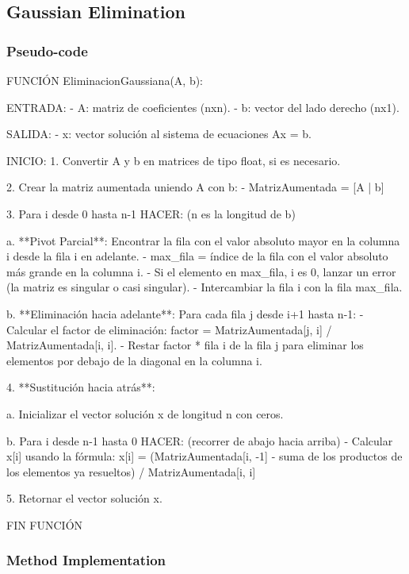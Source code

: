 \documentclass{article}
\begin{document}
    \subsection{Gaussian Elimination}
        \subsubsection{Pseudo-code}
        FUNCIÓN EliminacionGaussiana(A, b):

    ENTRADA:
    - A: matriz de coeficientes (nxn).
    - b: vector del lado derecho (nx1).

    SALIDA:
    - x: vector solución al sistema de ecuaciones Ax = b.

    INICIO:
    1. Convertir A y b en matrices de tipo float, si es necesario.

    2. Crear la matriz aumentada uniendo A con b:
       - MatrizAumentada = [A | b]

    3. Para i desde 0 hasta n-1 HACER:  (n es la longitud de b)

        a. **Pivot Parcial**: Encontrar la fila con el valor absoluto mayor en la columna i desde la fila i en adelante.
           - max_fila = índice de la fila con el valor absoluto más grande en la columna i.
           - Si el elemento en max_fila, i es 0, lanzar un error (la matriz es singular o casi singular).
           - Intercambiar la fila i con la fila max_fila.

        b. **Eliminación hacia adelante**: Para cada fila j desde i+1 hasta n-1:
            - Calcular el factor de eliminación: factor = MatrizAumentada[j, i] / MatrizAumentada[i, i].
            - Restar factor * fila i de la fila j para eliminar los elementos por debajo de la diagonal en la columna i.

    4. **Sustitución hacia atrás**:

        a. Inicializar el vector solución x de longitud n con ceros.

        b. Para i desde n-1 hasta 0 HACER: (recorrer de abajo hacia arriba)
           - Calcular x[i] usando la fórmula:
             x[i] = (MatrizAumentada[i, -1] - suma de los productos de los elementos ya resueltos) / MatrizAumentada[i, i]

    5. Retornar el vector solución x.

FIN FUNCIÓN

        \subsubsection{Method Implementation}
\end{document}
